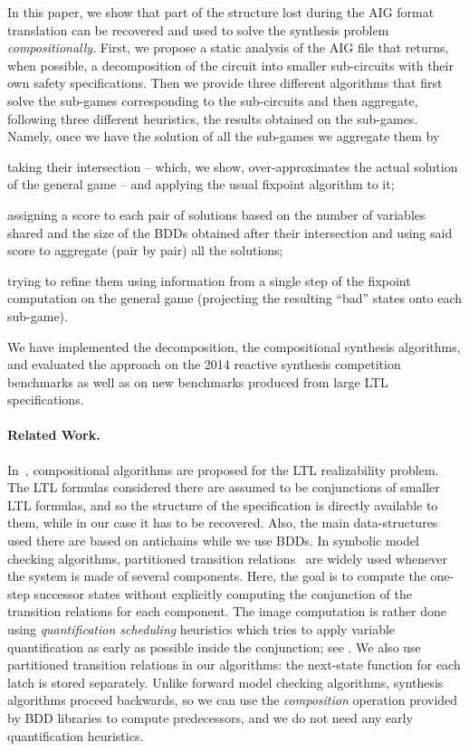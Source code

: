 \documentclass[submission,copyright,creativecommons]{eptcs}
\begin{document}
In this paper, we show that part of the structure lost during the AIG format
translation can be recovered and used to solve the synthesis problem {\em
compositionally}.  First, we propose a static analysis of the AIG file that
returns, when possible, a decomposition of the circuit into smaller sub-circuits
with their own safety specifications. Then we provide three different algorithms
that first solve the sub-games corresponding to the sub-circuits and then
aggregate, following three different heuristics, the results obtained on the
sub-games. Namely, once we have the solution of all the sub-games we aggregate
them by
\begin{inparaenum}[]
	\item taking their intersection -- which, we show, over-approximates the
		actual solution of the general game -- and applying the usual
		fixpoint algorithm to it;
	\item assigning a score to each pair of solutions based on the number of
		variables shared and the size of the BDDs obtained after their
		intersection and using said score to aggregate (pair by pair)
		all the solutions;
	\item trying to refine them using information from a single step of the
		fixpoint computation on the general game (\ie projecting the
		resulting ``bad'' states onto each sub-game).
\end{inparaenum}
We have implemented the decomposition, the compositional synthesis
algorithms, and evaluated the approach on the 2014 reactive synthesis
competition benchmarks as well as on new benchmarks produced from large LTL
specifications.

\paragraph{Related Work.}
In~\cite{FiliotJR10,FiliotJR11}, compositional algorithms are proposed for the
LTL realizability problem. The LTL formulas considered there are assumed to be
conjunctions of smaller LTL formulas, and so the structure of the specification
is directly available to them, while in our case it has to be recovered.  Also,
the main data-structures used there are based on antichains while we use BDDs.
In symbolic model checking algorithms, partitioned transition
relations~\cite{burch1991symbolic} are widely used whenever the system is made
of several components. Here, the goal is to compute the one-step successor
states without explicitly computing the conjunction of the transition relations
for each component.  The image computation is rather done using
\emph{quantification scheduling} heuristics which tries to apply variable
quantification as early as possible inside the conjunction; see \eg
\cite{wang2003compositional}.  We also use partitioned transition relations in
our algorithms: the next-state function for each latch is stored separately.
Unlike forward model checking algorithms, synthesis algorithms proceed
backwards, so we can use the \emph{composition} operation provided by BDD
libraries to compute predecessors, and we do not need any early quantification
heuristics.
\end{document}
